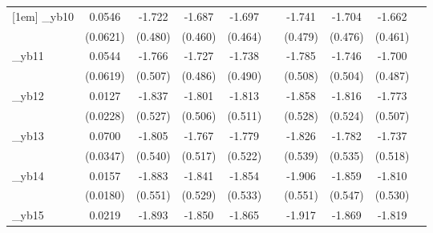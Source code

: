 \begin{table}[htbp]
\begin{tabular}{l*{9}{c}}
[1em]
\_yb10       &      0.0546         &      -1.722\sym{***}&      -1.687\sym{***}&      -1.697\sym{***}&                     &      -1.741\sym{***}&      -1.704\sym{***}&      -1.662\sym{***}&                     \\
            &    (0.0621)         &     (0.480)         &     (0.460)         &     (0.464)         &                     &     (0.479)         &     (0.476)         &     (0.461)         &                     \\
[1em]
\_yb11       &      0.0544         &      -1.766\sym{***}&      -1.727\sym{***}&      -1.738\sym{***}&                     &      -1.785\sym{***}&      -1.746\sym{***}&      -1.700\sym{***}&                     \\
            &    (0.0619)         &     (0.507)         &     (0.486)         &     (0.490)         &                     &     (0.508)         &     (0.504)         &     (0.487)         &                     \\
[1em]
\_yb12       &      0.0127         &      -1.837\sym{***}&      -1.801\sym{***}&      -1.813\sym{***}&                     &      -1.858\sym{***}&      -1.816\sym{***}&      -1.773\sym{***}&                     \\
            &    (0.0228)         &     (0.527)         &     (0.506)         &     (0.511)         &                     &     (0.528)         &     (0.524)         &     (0.507)         &                     \\
[1em]
\_yb13       &      0.0700\sym{**} &      -1.805\sym{***}&      -1.767\sym{***}&      -1.779\sym{***}&                     &      -1.826\sym{***}&      -1.782\sym{***}&      -1.737\sym{***}&                     \\
            &    (0.0347)         &     (0.540)         &     (0.517)         &     (0.522)         &                     &     (0.539)         &     (0.535)         &     (0.518)         &                     \\
[1em]
\_yb14       &      0.0157         &      -1.883\sym{***}&      -1.841\sym{***}&      -1.854\sym{***}&                     &      -1.906\sym{***}&      -1.859\sym{***}&      -1.810\sym{***}&                     \\
            &    (0.0180)         &     (0.551)         &     (0.529)         &     (0.533)         &                     &     (0.551)         &     (0.547)         &     (0.530)         &                     \\
[1em]
\_yb15       &      0.0219         &      -1.893\sym{***}&      -1.850\sym{***}&      -1.865\sym{***}&                     &      -1.917\sym{***}&      -1.869\sym{***}&      -1.819\sym{***}&                     \\

\end{tabular}
\end{table}
